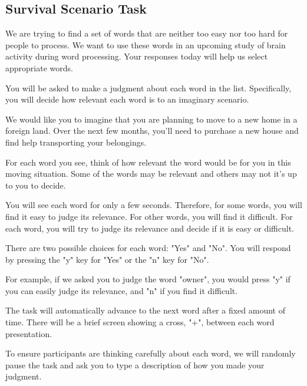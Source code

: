 \documentclass[man,natbib,floatsintext]{apa6} %
\begin{document}
\subsection{Survival Scenario Task}
\begin{displayquote}
We are trying to find a set of words that are neither too easy nor too hard for people to process. We want to use these words in an upcoming study of brain activity during word processing. Your responses today will help us select appropriate words.

You will be asked to make a judgment about each word in the list. Specifically, you will decide how relevant each word is to an imaginary scenario.

We would like you to imagine that you are planning to move to a new home in a foreign land. Over the next few months, you'll need to purchase a new house and find help transporting your belongings.

For each word you see, think of how relevant the word would be for you in this moving situation. Some of the words may be relevant and others may not it's up to you to decide.

You will see each word for only a few seconds. Therefore, for some words, you will find it easy to judge its relevance. For other words, you will find it difficult. For each word, you will try to judge its relevance and decide if it is easy or difficult.

There are two possible choices for each word: "Yes" and "No". You will respond by pressing the "y" key for "Yes" or the "n" key for "No".

For example, if we asked you to judge the word "owner", you would press "y" if you can easily judge its relevance, and "n" if you find it difficult.

The task will automatically advance to the next word after a fixed amount of time. There will be a brief screen showing a cross, "+", between each word presentation.

To ensure participants are thinking carefully about each word, we will randomly pause the task and ask you to type a description of how you made your judgment.
\end{displayquote}
\end{document}
